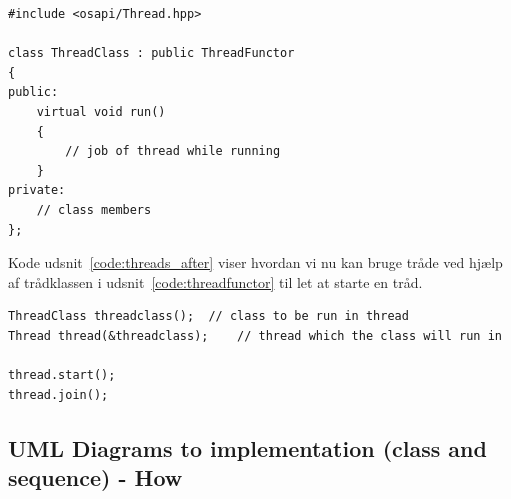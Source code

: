 \begin{lstlisting}[caption=Trådklasse via nedarvning fra ThreadFunctor, label=code:threadfunctor]
#include <osapi/Thread.hpp>

class ThreadClass : public ThreadFunctor 
{
public:
	virtual void run() 
	{
		// job of thread while running
	}
private:
	// class members
};
\end{lstlisting}

Kode udsnit~\ref{code:threads_after} viser hvordan vi nu kan bruge tråde ved hjælp af trådklassen i udsnit~\ref{code:threadfunctor} til let at starte en tråd.

\begin{lstlisting}[caption=Anvendelse af tråde efter OSAPI,
label=code:threads_after,
morekeywords={ThreadClass, Thread, join, start}]
ThreadClass threadclass();	// class to be run in thread
Thread thread(&threadclass);	// thread which the class will run in

thread.start();
thread.join();
\end{lstlisting}

\subsection{UML Diagrams to implementation (class and sequence) - How}

